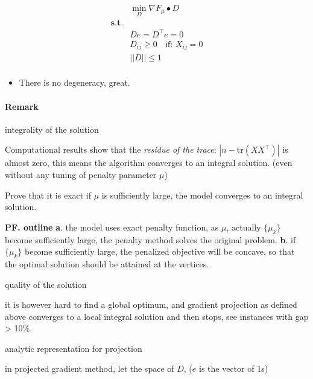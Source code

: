 \documentclass[
  10pt,
  a4paper,
,tablecaptionabove
]{scrartcl}
\providecommand{\tightlist}{%
  \setlength{\itemsep}{0pt}\setlength{\parskip}{0pt}}
\renewenvironment{quote}{\begin{customblockquote}\list{}{\rightmargin=0em\leftmargin=0em}%
\item\relax\color{blockquote-text}\ignorespaces}{\unskip\unskip\endlist\end{customblockquote}}
\begin{document}
\[\begin{aligned}
&\min_D \nabla F_\mu \bullet D   \\
\mathbf{s.t.} & \\
&D e = D^\top e = 0 \\ 
&D_{ij} \ge 0 \quad \textsf{if: } X_{ij} = 0\\ 
&||D||\le 1 \\
\end{aligned}\]

\begin{itemize}
\tightlist
\item
  There is no degeneracy, great.
\end{itemize}

\hypertarget{remark}{%
\paragraph{Remark}\label{remark}}

\begin{quote}
integrality of the solution
\end{quote}

Computational results show that the \emph{residue of the trace}:
\(|n - \textrm{tr}(XX^\top)|\) is almost zero, this means the algorithm
converges to an integral solution. (even without any tuning of penalty
parameter \(\mu\))

Prove that it is exact if \(\mu\) is sufficiently large, the model
converges to an integral solution.

\textbf{PF. outline} \textbf{a}. the model uses exact penalty function,
as \(\mu\), actually \(\{\mu_k\}\) become sufficiently large, the
penalty method solves the original problem. \textbf{b}. if \(\{\mu_k\}\)
become sufficiently large, the penalized objective will be concave, so
that the optimal solution should be attained at the vertices.

\begin{quote}
quality of the solution
\end{quote}

it is however hard to find a global optimum, and gradient projection as
defined above converges to a local integral solution and then stops, see
instances with gap \textgreater{} 10\%.

\begin{quote}
analytic representation for projection
\end{quote}

in projected gradient method, let the space of \(D\), (\(e\) is the
vector of 1s)
\end{document}

